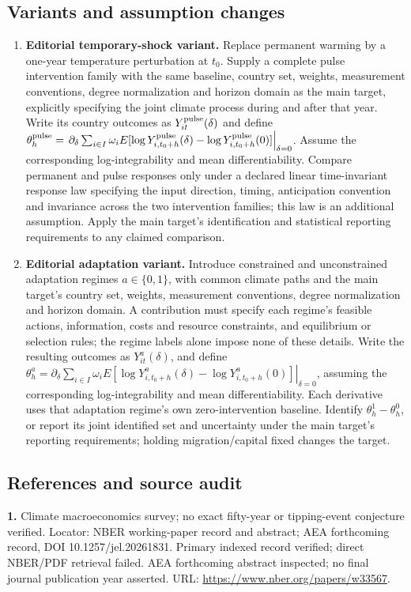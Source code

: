 \documentclass[11pt,a4paper]{article}
\begin{document}
\subsection*{Variants and assumption changes}
\begin{enumerate}
\item \textbf{Editorial temporary-shock variant.} Replace permanent warming by a one-year temperature perturbation at \(t_0\). Supply a complete pulse intervention family with the same baseline, country set, weights, measurement conventions, degree normalization and horizon domain as the main target, explicitly specifying the joint climate process during and after that year. Write its country outcomes as \(Y^{\rm pulse}_{it}(\delta)\) and define \(\theta_h^{\rm pulse}=\left.\partial_\delta\sum_{i\in I}\omega_iE[\log Y^{\rm pulse}_{i,t_0+h}(\delta)-\log Y^{\rm pulse}_{i,t_0+h}(0)]\right|_{\delta=0}\). Assume the corresponding log-integrability and mean differentiability. Compare permanent and pulse responses only under a declared linear time-invariant response law specifying the input direction, timing, anticipation convention and invariance across the two intervention families; this law is an additional assumption. Apply the main target's identification and statistical reporting requirements to any claimed comparison.
\item \textbf{Editorial adaptation variant.} Introduce constrained and unconstrained adaptation regimes \(a\in\{0,1\}\), with common climate paths and the main target's country set, weights, measurement conventions, degree normalization and horizon domain. A contribution must specify each regime's feasible actions, information, costs and resource constraints, and equilibrium or selection rules; the regime labels alone impose none of these details. Write the resulting outcomes as \(Y^a_{it}(\delta)\), and define \(\theta_h^a=\left.\partial_\delta\sum_{i\in I}\omega_iE[\log Y^a_{i,t_0+h}(\delta)-\log Y^a_{i,t_0+h}(0)]\right|_{\delta=0}\), assuming the corresponding log-integrability and mean differentiability. Each derivative uses that adaptation regime's own zero-intervention baseline. Identify \(\theta_h^1-\theta_h^0\), or report its joint identified set and uncertainty under the main target's reporting requirements; holding migration/capital fixed changes the target.
\end{enumerate}
\subsection*{References and source audit}
\textbf{1.} Climate macroeconomics survey; no exact fifty-year or tipping-event conjecture verified. Locator: NBER working-paper record and abstract; AEA forthcoming record, DOI 10.1257/jel.20261831. Primary indexed record verified; direct NBER/PDF retrieval failed. AEA forthcoming abstract inspected; no final journal publication year asserted. URL: \url{https://www.nber.org/papers/w33567}.
\end{document}
